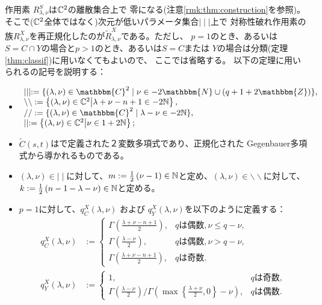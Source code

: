 \documentclass[12pt]{article} %
\newcommand{\tisevenjap}{\mbox{は偶数}}
\newcommand{\tisoddjap}{\mbox{は奇数}}
\newcommand{\assign}{:=}
\theoremstyle{definition}
\theoremstyle{exampstyle} \newtheorem{examp}[theorem]{Theorem}
\newcommand{\bb}{\backslash\backslash}
\begin{document}
作用素
$R_{\lambda,\nu}^S$は$\mathbb{C}^2$の離散集合上で
零になる(注意\ref{rmk:thm:construction}を参照)。
{そこで($\mathbb{C}^2$全体ではなく)次元が低いパラメータ集合$\mid\mid\mid$上で}
	対称性破れ作用素の族$R_{\lambda,\nu}^X$を再正規化したのが$\tilde{R}_{\lambda,\nu}^X$である。ただし、
	$p=1$のとき、あるいは$S=C\cap Y$の場合と$p>1$のとき、あるいは$S=C$または
$Y$の場合は分類(定理\ref{thm:classif})に用いなくてもよいので、
ここでは省略する。
以下の定理に用いられるの記号を説明する：
\begin{itemize}
	\item 
		\begin{equation*}
			\begin{array}[]{l}
			\mid \mid \mid \assign \{ (\lambda, \nu) \in \mathbbm{C}^2 \mid \nu \in
	- 2\mathbbm{N} \cup (q + 1 + 2\mathbbm{Z}) \},\\
\backslash\backslash:=\mysetn{(\lambda,\nu)\in\C^2}{\lambda+\nu-n+1\in-2\N},\\
/ / \assign
\{ (\lambda, \nu) \in \mathbbm{C}^2 \mid \lambda - \nu \in
-2\N \},\\
\mid\mid:=\mysetn{(\lambda,\nu)\in\C^2}{\nu\in1+2\N};
			\end{array}
		\end{equation*}
\item $\tilde{C}(s,t)$は\cite[(6.5)]{Kobayashi2016}で定義された２変数多項式であり、正規化された
	Gegenbauer多項式から導かれるものである。
\item 
$(\lambda,\nu)\in\mid\mid$に対して、$m:=\frac{1}{2}\left( \nu-1 \right)\in\mathbb{N}$と定め、$(\lambda,\nu)\in\bb$に対して、$k:=\frac{1}{2}\left( n-1-\lambda-\nu \right)\in\mathbb{N}$と定める。
\item 
$p=1$に対して、$q_C^X(\lambda,\nu)$ および $q_Y^X(\lambda,\nu)$を以下のように定義する：
\begin{align*}
 q_C^X (\lambda, \nu) &:= \left\{ \begin{array}{ll}
     \Gamma^{} \left( \frac{\lambda + \nu - n + 1}{2} \right), & q\tisevenjap
     , \nu \leqslant q - \nu,\\
     \Gamma^{} \left( \frac{\lambda - \nu}{2} \right), & q\tisevenjap,
     \nu > q - \nu,\\
     \Gamma \left( \frac{\lambda + \nu - n + 1}{2} \right), & q\tisoddjap
     .
   \end{array} \right.\\
q_Y^X (\lambda, \nu) &:= \left\{ \begin{array}{ll}
     1, & 
      q \tisoddjap,\\
      \Gamma \left( \frac{\lambda -
     \nu}{2} \right) / \Gamma \left( \max \left\{ \frac{\lambda + \nu}{2}, 0
     \right\} - \nu \right), & q
     \tisevenjap.
   \end{array} \right.
\end{align*}
\end{itemize}
\end{document}
